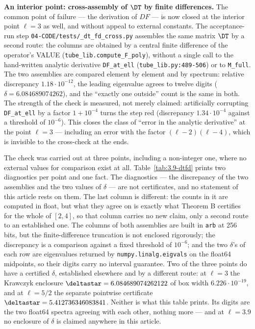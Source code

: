 \textbf{An interior point: cross-assembly of $\DT$ by finite differences.} The common point of failure --- the derivation of $DF$ --- is now closed at the interior point $\ell = 3$ as well, and without appeal to external constants. The acceptance-run step \texttt{04-\allowbreak CODE/\allowbreak tests/\allowbreak \_\allowbreak dt\_\allowbreak fd\_\allowbreak cross.py} assembles the same matrix $\DT$ by a second route: the columns are obtained by a central finite difference of the operator's VALUE (\texttt{tube\_\allowbreak lib.compute\_\allowbreak F\_\allowbreak poly}), without a single call to the hand-written analytic derivative \texttt{DF\_at\_ell} (\texttt{tube\_\allowbreak lib.py:489-506}) or to \texttt{M\_full}. The two assemblies are compared element by element and by spectrum: relative discrepancy $1.18\cdot 10^{-12}$, the leading eigenvalue agrees to twelve digits ($\delta = 6.084689074262$), and the ``exactly one outside'' count is the same in both. The strength of the check is measured, not merely claimed: artificially corrupting \texttt{DF\_at\_ell} by a factor $1 + 10^{-4}$ turns the step red (discrepancy $1.34\cdot 10^{-4}$ against a threshold of $10^{-6}$). This closes the class of ``error in the analytic derivative'' at the point $\ell = 3$ --- including an error with the factor $(\ell-2)(\ell-4)$, which is invisible to the cross-check at the ends.

The check was carried out at three points, including a non-integer one, where no external values for comparison exist at all. Table~\ref{tab:3.9-dtfd} prints two diagnostics per point and one fact. The diagnostics --- the discrepancy of the two assemblies and the two values of $\delta$ --- are not certificates, and no statement of this article rests on them. The last column is different: the counts in it are computed in float, but what they agree on is exactly what Theorem B certifies for the whole of $[2,4]$, so that column carries no new claim, only a second route to an established one. The columns of both assemblies are built in \texttt{arb} at 256 bits, but the finite-difference truncation is not enclosed rigorously; the discrepancy is a comparison against a fixed threshold of $10^{-6}$; and the two $\delta$'s of each row are eigenvalues returned by \texttt{numpy.\allowbreak linalg.\allowbreak eigvals} on the float64 midpoints, so their digits carry no interval guarantee. Two of the three points do have a certified $\delta$, established elsewhere and by a different route: at $\ell = 3$ the Krawczyk enclosure $\deltastar = 6.084689074262122$ of box width $6.226\cdot 10^{-19}$, and at $\ell = 5/2$ the separate pointwise certificate $\deltastar = 5.412736346083841$. Neither is what this table prints. Its digits are the two float64 spectra agreeing with each other, nothing more --- and at $\ell = 3.9$ no enclosure of $\delta$ is claimed anywhere in this article.

